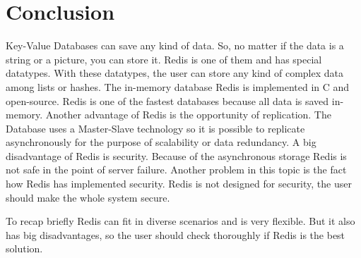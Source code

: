 \section{Conclusion}
Key-Value Databases can save any kind of data. So, no matter if the data is a string or a picture, you can store it. Redis is one of them and has special datatypes. With these datatypes, the user can store any kind of complex data among lists or hashes. The in-memory database Redis is implemented in C and open-source. Redis is one of the fastest databases because all data is saved in-memory. Another advantage of Redis is the opportunity of replication. The Database uses a Master-Slave technology so it is possible to replicate asynchronously for the purpose of scalability or data redundancy. A big disadvantage of Redis is security. Because of the asynchronous storage Redis is not safe in the point of server failure. Another problem in this topic is the fact how Redis has implemented security. Redis is not designed for security, the user should make the whole system secure.
 
 To recap briefly Redis can fit in diverse scenarios and is very flexible. But it also has big disadvantages, so the user should check thoroughly if Redis is the best solution.